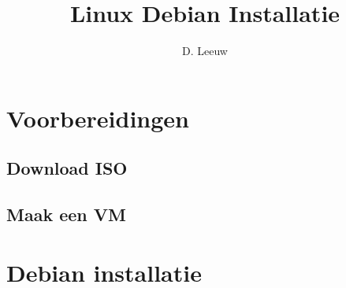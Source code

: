 \documentclass[a4paper,12pt,twoside,openright,titlepage]{article}
\author{D. Leeuw}
\title{Linux Debian Installatie}
\date{\today\\
0.5.2\\
\vfill
\raggedright
\copyright\ 2020-2025 Dennis Leeuw\\
}
\begin{document}

\maketitle


%
%


\section{Voorbereidingen}
\subsection{Download ISO}

\subsection{Maak een VM}


\section{Debian installatie}


\printindex
\end{document}
